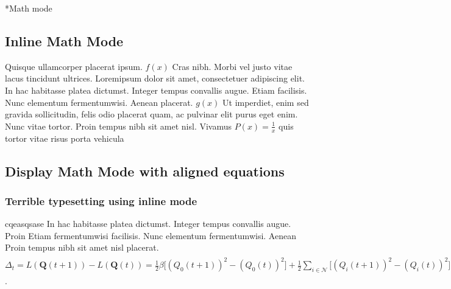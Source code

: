 \documentclass{article}
\begin{document}
\begin{homeworkProblem}*{Math mode}

\subsection{Inline Math Mode}

Quisque ullamcorper placerat ipsum. 
										{\color{blue}$f(x)$} 
Cras nibh. Morbi vel justo vitae lacus tincidunt ultrices. Loremipsum dolor sit amet, consectetuer adipiscing elit. In hac habitasse platea dictumst. Integer tempus convallis augue. Etiam facilisis. Nunc elementum fermentumwisi. Aenean placerat. 
										{\color{blue}\(g(x)\)}
Ut imperdiet, enim sed gravida sollicitudin, felis odio placerat quam, ac pulvinar elit purus eget enim. Nunc vitae tortor. Proin tempus nibh sit amet nisl. Vivamus
								{\color{blue} \begin{math} P(x) = \frac{1}{x} \end{math}}
quis tortor vitae risus porta vehicula

\subsection{Display Math Mode with aligned equations}

\subsubsection{Terrible typesetting using inline mode}

cqeasqsase In hac habitasse platea dictumst. Integer tempus convallis augue. Proin Etiam fermentumwisi facilisis. Nunc elementum fermentumwisi. Aenean  Proin tempus nibh sit amet nisl placerat.
$ \Delta_{t} = L ( \boldsymbol{Q}(t+1) ) - L( \boldsymbol{Q}(t) ) 
= \frac{1}{2} \beta \Big[ (Q_{0}(t+1))^{2}  - (Q_{0}(t))^{2} \Big] + \frac{1}{2} \sum_{i \in \mathcal{N}} \Big[ (Q_{i}(t+1))^{2} - (Q_{i}(t))^{2} \Big]
\overset{(a)}{\le} \frac{1}{2} \beta \left\{ \Big[ Q_{0}(t) + \sum_{i \in \mathcal{N}} E_{i}(t) x_{i}(t) - b \Big]^{2} \!\!\!- (Q_{0}(t))^{2} \right\} + \frac{1}{2} \sum_{i \in \mathcal{N}} \Big\{ \Big[ Q_{i}(t) + c_{i} - x_{i}(t) \Big]^{2} \!\!\!- (Q_{i}(t))^{2} \Big\}
= \frac{1}{2} \beta \Big[ \sum_{i \in \mathcal{N}} E_{i}(t) x_{i}(t) - b  \Big]^{2} + \beta Q_{0}(t) \Big[ \sum_{i \in \mathcal{N}} E_{i}(t) x_{i}(t)  - b \Big]
+ \frac{1}{2} \sum_{i \in \mathcal{N}} \Big[ c_{i} - x_{i}(t) \Big]^{2} + \sum_{i \in \mathcal{N}} Q_{i}(t) \Big[  c_{i} - x_{i}(t) \Big] $.


\end{homeworkProblem}
\end{document}
